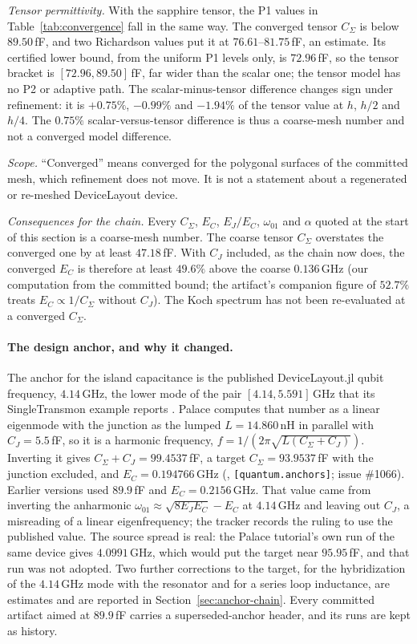 \documentclass{anvil-paper}
\begin{document}
\emph{Tensor permittivity.} With the sapphire tensor, the P1 values in
Table~\ref{tab:convergence} fall in the same way. The converged tensor
$C_\Sigma$ is below $89.50$\,fF, and two Richardson values put it at
$76.61$--$81.75$\,fF, an estimate. Its certified lower bound, from the
uniform P1 levels only, is $72.96$\,fF, so the tensor bracket is
$[72.96, 89.50]$\,fF, far wider than the scalar one; the tensor model
has no P2 or adaptive path. The scalar-minus-tensor difference changes
sign under refinement: it is $+0.75\%$, $-0.99\%$ and $-1.94\%$ of the
tensor value at $h$, $h/2$ and $h/4$. The $0.75\%$ scalar-versus-tensor
difference is thus a coarse-mesh number and not a converged model
difference.

\emph{Scope.} ``Converged'' means converged for the polygonal surfaces
of the committed mesh, which refinement does not move. It is not a
statement about a regenerated or re-meshed DeviceLayout device.

\emph{Consequences for the chain.} Every $C_\Sigma$, $E_C$, $E_J/E_C$,
$\omega_{01}$ and $\alpha$ quoted at the start of this section is a
coarse-mesh number. The coarse tensor $C_\Sigma$ overstates the
converged one by at least $47.18$\,fF. With $C_J$ included, as the chain
now does, the converged $E_C$ is therefore at least $49.6\%$ above the
coarse $0.136$\,GHz (our computation from the committed bound; the
artifact's companion figure of $52.7\%$ treats $E_C \propto
1/C_\Sigma$ without $C_J$). The Koch spectrum has not been re-evaluated
at a converged $C_\Sigma$.

\paragraph{The design anchor, and why it changed.}
The anchor for the island capacitance is the published DeviceLayout.jl
qubit frequency, $4.14$\,GHz, the lower mode of the pair
$[4.14, 5.591]$\,GHz that its SingleTransmon example reports
\citep{devicelayout-blog}. Palace computes that number as a linear
eigenmode with the junction as the lumped $L = 14.860$\,nH in parallel
with $C_J = 5.5$\,fF, so it is a harmonic frequency,
$f = 1/(2\pi\sqrt{L(C_\Sigma + C_J)})$. Inverting it gives
$C_\Sigma + C_J = 99.4537$\,fF, a target $C_\Sigma = 93.9537$\,fF with
the junction excluded, and $E_C = 0.194766$\,GHz
(, \texttt{[quantum.anchors]};
issue \#1066). Earlier versions used $89.9$\,fF and
$E_C = 0.2156$\,GHz. That value came from inverting the anharmonic
$\omega_{01} \approx \sqrt{8E_JE_C} - E_C$ at $4.14$\,GHz and leaving
out $C_J$, a misreading of a linear eigenfrequency; the tracker records
the ruling to use the published value. The source spread is real: the
Palace tutorial's own run of the same device gives $4.0991$\,GHz,
which would put the target near $95.95$\,fF, and that run was not
adopted. Two further corrections to the target, for the hybridization
of the $4.14$\,GHz mode with the resonator and for a series loop
inductance, are estimates and are reported in
Section~\ref{sec:anchor-chain}. Every committed artifact aimed at
$89.9$\,fF carries a superseded-anchor header, and its runs are kept as
history.
\end{document}
